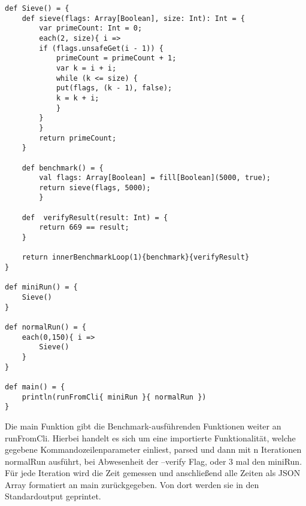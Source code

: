 \begin{lstlisting}
def Sieve() = {
    def sieve(flags: Array[Boolean], size: Int): Int = {
        var primeCount: Int = 0;
        each(2, size){ i =>
        if (flags.unsafeGet(i - 1)) {
            primeCount = primeCount + 1;
            var k = i + i;
            while (k <= size) {
            put(flags, (k - 1), false);
            k = k + i;
            }
        }
        }
        return primeCount;
    }
    
    def benchmark() = {
        val flags: Array[Boolean] = fill[Boolean](5000, true);
        return sieve(flags, 5000);
        }
    
    def  verifyResult(result: Int) = {
        return 669 == result;
    }
    
    return innerBenchmarkLoop(1){benchmark}{verifyResult}   
}
    
def miniRun() = {
    Sieve()
}

def normalRun() = {
    each(0,150){ i =>
        Sieve()
    }
}

def main() = {
    println(runFromCli{ miniRun }{ normalRun })
}
\end{lstlisting}
Die main Funktion gibt die Benchmark-ausführenden Funktionen weiter an runFromCli. Hierbei handelt es sich um eine importierte Funktionalität, welche gegebene Kommandozeilenparameter einliest, parsed und dann mit n Iterationen normalRun ausführt, bei Abwesenheit der --verify Flag, oder 3 mal den miniRun.
Für jede Iteration wird die Zeit gemessen und anschließend alle Zeiten als JSON Array formatiert an main zurückgegeben. Von dort werden sie in den Standardoutput geprintet.

